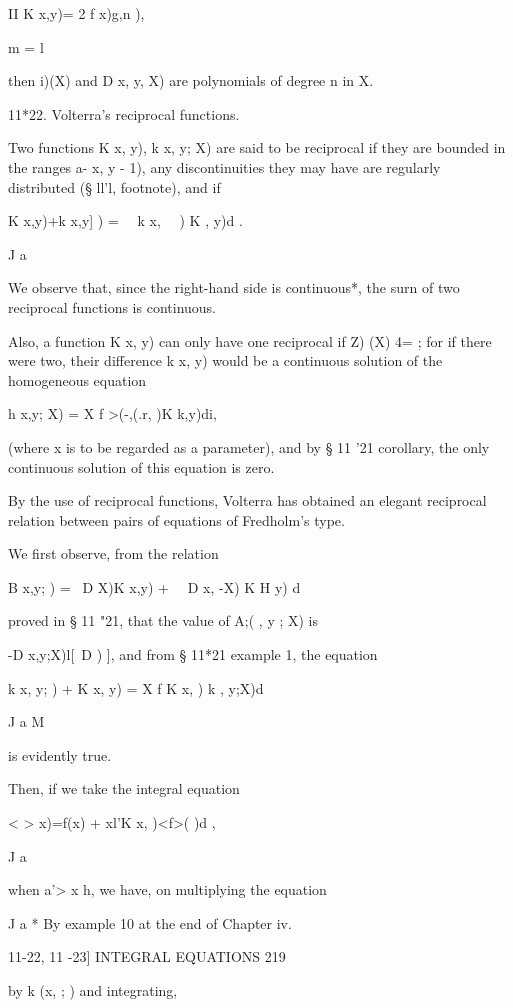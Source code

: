 II 
K x,y)= 2 f   x)g,n  ), 

m = l 

then i)(X) and D x, y, X) are polynomials of degree n in X. 

11*22. Volterra's reciprocal functions. 

Two functions K  x, y), k x, y; X) are said to be reciprocal if they are 
bounded in the ranges a- x, y - 1),  any discontinuities they may have are 
regularly distributed (§ ll'l, footnote), and if 

K x,y)+k x,y] )  = \ \  k x,  \ \ ) K   , y)d . 

J a 

We observe that, since the right-hand side is continuous*, the surn of two reciprocal 
functions is continuous. 

Also, a function K  x, y) can only have one reciprocal if Z) (X) 4= ; for if there were two, 
their difference k   x, y) would be a continuous solution of the homogeneous equation 

h x,y; X) = X f >(-,(.r,  )K k,y)di, 

(where x is to be regarded as a parameter), and by § 11 '21 corollary, the only continuous 
solution of this equation is zero. 

By the use of reciprocal functions, Volterra has obtained an elegant 
reciprocal relation between pairs of equations of Fredholm's type. 

We first observe, from the relation 

B x,y; )  = \ D X)K x,y) + \ \  D  x,   -X) K H y) d  

proved in § 11 "21, that the value of A;( , y ; X) is 

-D x,y;X)l[\ D  ) ], 
and from § 11*21 example 1, the equation 

k  x, y; )  + K x, y) = X f K  x,  ) k   , y;X)d  

J a M 

is evidently true. 

Then, if we take the integral equation 

< > x)=f(x) + xl'K x, )<f>( )d , 

J a 

when a'> x h, we have, on multiplying the equation 

J a 
* By example 10 at the end of Chapter iv. 



11-22, 11 -23] INTEGRAL EQUATIONS 219 

by k (x,   ;  )  and integrating, 

